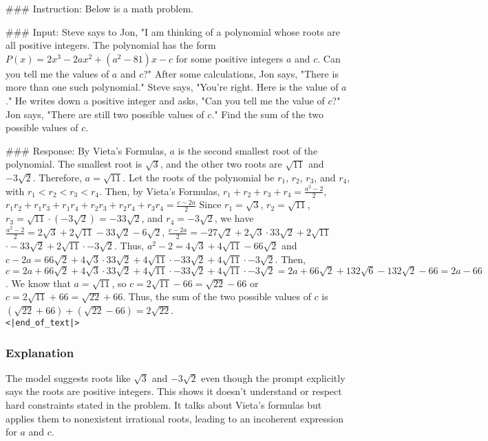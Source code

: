 \#\#\# Instruction: Below is a math problem.

\#\#\# Input: Steve says to Jon, "I am thinking of a polynomial whose roots are all positive integers. The polynomial has the form $P(x) = 2x^3-2ax^2+(a^2-81)x-c$ for some positive integers $a$ and $c$. Can you tell me the values of $a$ and $c$?" After some calculations, Jon says, "There is more than one such polynomial." Steve says, "You're right. Here is the value of $a$." He writes down a positive integer and asks, "Can you tell me the value of $c$?" Jon says, "There are still two possible values of $c$." Find the sum of the two possible values of $c$.

\#\#\# Response: By Vieta's Formulas, $a$ is the second smallest root of the polynomial. The smallest root is $\sqrt{3}$, and the other two roots are $\sqrt{11}$ and $-3\sqrt{2}$. Therefore, $a = \sqrt{11}$. Let the roots of the polynomial be $r_1$, $r_2$, $r_3$, and $r_4$, with $r_1 < r_2 < r_3 < r_4$. Then, by Vieta's Formulas, $r_1+r_2+r_3+r_4 = \frac{a^2-2}2$, $r_1r_2+r_1r_3+r_1r_4+r_2r_3+r_2r_4+r_3r_4 = \frac{c-2a}2$ Since $r_1 = \sqrt{3}$, $r_2 = \sqrt{11}$, $r_3 = \sqrt{11} \cdot (-3\sqrt{2}) = -33\sqrt{2}$, and $r_4 = -3\sqrt{2}$, we have $\frac{a^2-2}2 = 2\sqrt{3} + 2\sqrt{11} - 33\sqrt{2} - 6\sqrt{2}$, $\frac{c-2a}2 = -27\sqrt{2} + 2\sqrt{3} \cdot 33\sqrt{2} + 2\sqrt{11}$ $\cdot -33\sqrt{2} + 2\sqrt{11} \cdot -3\sqrt{2}$. Thus, $a^2-2 = 4\sqrt{3} + 4\sqrt{11} - 66\sqrt{2}$ and $c-2a = 66\sqrt{2} + 4\sqrt{3} \cdot 33\sqrt{2} + 4\sqrt{11} \cdot -33\sqrt{2} + 4\sqrt{11} \cdot -3\sqrt{2}$. Then, $c = 2a + 66\sqrt{2} + 4\sqrt{3} \cdot 33\sqrt{2} + 4\sqrt{11} \cdot -33\sqrt{2} + 4\sqrt{11} \cdot -3\sqrt{2} = 2a + 66\sqrt{2} + 132\sqrt{6} - 132\sqrt{2} - 66 = 2a - 66$. We know that $a = \sqrt{11}$, so $c = 2\sqrt{11} - 66 = \sqrt{22} - 66$ or $c = 2\sqrt{11} + 66 = \sqrt{22} + 66$. Thus, the sum of the two possible values of $c$ is $(\sqrt{22} + 66) + (\sqrt{22} - 66) = \boxed{2\sqrt{22}}$. \\\texttt{<|end\_of\_text|>}

\subsubsection{Explanation}
The model suggests roots like $\sqrt{3}$ and $-3\sqrt{2}$ even though the prompt explicitly says the roots are positive integers. This shows it doesn't understand or respect hard constraints stated in the problem. It talks about Vieta's formulas but applies them to nonexistent irrational roots, leading to an incoherent expression for $a$ and $c$. 


